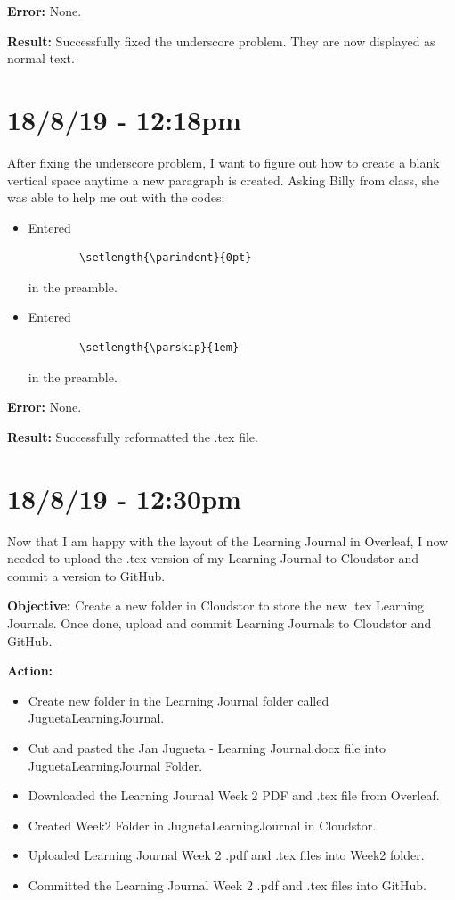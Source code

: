 \documentclass{article}
\begin{document}
\textbf{Error:} None.

\textbf{Result:} Successfully fixed the underscore problem. They are now displayed as normal text.

\section*{18/8/19 - 12:18pm}

After fixing the underscore problem, I want to figure out how to create a blank vertical space anytime a new paragraph is created. Asking Billy from class, she was able to help me out with the codes:

\begin{itemize}
    \item Entered \begin{verbatim}
        \setlength{\parindent}{0pt}
    \end{verbatim} in the preamble.
    \item Entered \begin{verbatim}
        \setlength{\parskip}{1em} 
    \end{verbatim} in the preamble.
\end{itemize}

\textbf{Error:} None.

\textbf{Result:} Successfully reformatted the .tex file.

\section*{18/8/19 - 12:30pm}

Now that I am happy with the layout of the Learning Journal in Overleaf, I now needed to upload the .tex version of my Learning Journal to Cloudstor and commit a version to GitHub.

\textbf{Objective:} Create a new folder in Cloudstor to store the new .tex Learning Journals. Once done, upload and commit Learning Journals to Cloudstor and GitHub.

\textbf{Action:}
\begin{itemize}
    \item Create new folder in the Learning Journal folder called JuguetaLearningJournal.
    \item Cut and pasted the Jan Jugueta - Learning Journal.docx file into JuguetaLearningJournal Folder.
    \item Downloaded the Learning Journal Week 2 PDF and .tex file from Overleaf.
    \item Created Week2 Folder in JuguetaLearningJournal in Cloudstor.
    \item Uploaded Learning Journal Week 2 .pdf and .tex files into Week2 folder.
    \item Committed the Learning Journal Week 2 .pdf and .tex files into GitHub.
\end{itemize}
\end{document}
